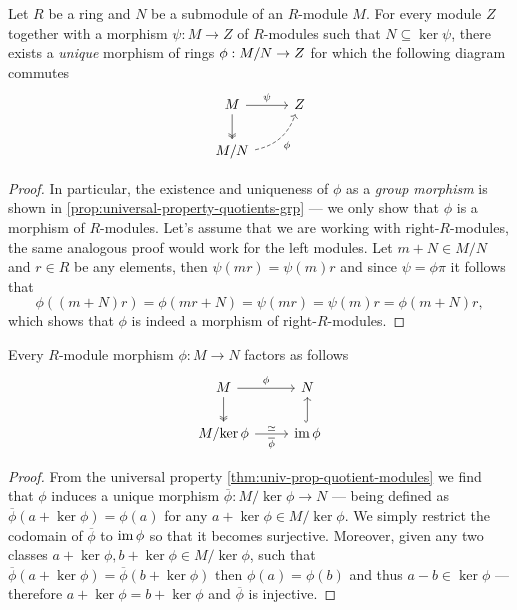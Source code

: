 \begin{theorem}
\label{thm:univ-prop-quotient-modules}
Let \(R\) be a ring and \(N\) be a submodule of an \(R\)-module \(M\). For every
module \(Z\) together with a morphism \(\psi: M \to Z\) of \(R\)-modules such
that \(N \subseteq \ker \psi\), there exists a \emph{unique} morphism of rings
\(\phi: M/N \to Z\) for which the following diagram commutes
\[
\begin{tikzcd}
M \ar[d, two heads] \ar[r, "\psi"] & Z \\
M/N \ar[ru, dashed, bend right, "\phi"']
\end{tikzcd}
\]
\end{theorem}

\begin{proof}
In particular, the existence and uniqueness of \(\phi\) as a \emph{group
  morphism} is shown in \cref{prop:universal-property-quotients-grp} --- we only
show that \(\phi\) is a morphism of \(R\)-modules. Let's assume that we are
working with right-\(R\)-modules, the same analogous proof would work for the
left modules. Let \(m + N \in M/N\) and \(r \in R\) be any elements, then
\(\psi(m r) = \psi(m) r\) and since \(\psi = \phi \pi\) it follows that
\[
\phi((m + N) r) = \phi(m r + N) = \psi(m r) = \psi(m) r = \phi(m + N) r,
\]
which shows that \(\phi\) is indeed a morphism of right-\(R\)-modules.
\end{proof}

\begin{theorem}
\label{thm:R-module-morphism-factorization}
Every \(R\)-module morphism \(\phi: M \to N\) factors as follows
\[
\begin{tikzcd}
M \ar[r, "\phi"] \ar[d, two heads] &N \\
M/{\ker \phi} \ar[r, "\dis", "\overline{\phi}"'] & \im \phi \ar[u, hook]
\end{tikzcd}
\]
\end{theorem}

\begin{proof}
From the universal property \cref{thm:univ-prop-quotient-modules} we find that
\(\phi\) induces a unique morphism \(\overline{\phi}: M/{\ker \phi} \to N\) ---
being defined as \(\overline{\phi}(a + \ker \phi) = \phi(a)\) for any
\(a + \ker \phi \in M/{\ker \phi}\). We simply restrict the codomain of
\(\overline{\phi}\) to \(\operatorname{im} \phi\) so that it becomes surjective. Moreover,
given any two classes \(a + \ker \phi, b + \ker \phi \in M/{\ker \phi}\), such
that \(\overline{\phi}(a + \ker \phi) = \overline{\phi}(b + \ker \phi)\) then
\(\phi(a) = \phi(b)\) and thus \(a - b \in \ker \phi\) --- therefore \(a + \ker
\phi = b + \ker \phi\) and \(\overline{\phi}\) is injective.
\end{proof}

